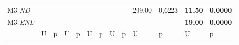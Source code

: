 \begin{table}[H]
\begin{tabular}{l|ll|ll|ll|ll|ll|ll}
M3 \textit{ND}  & \textbf{}      & \textbf{}       & \textbf{}                 & \textbf{}                & \textbf{}                 & \textbf{}                 & \textbf{}                 & \textbf{}                & 209,00                    & 0,6223                    & \textbf{11,50}  & \textbf{0,0000} \\
M3 \textit{END} & \textbf{}      & \textbf{}       & \textbf{}                 & \textbf{}                & \textbf{}                 & \textbf{}                 & \textbf{}                 & \textbf{}                & \textbf{}                 & \textbf{}                 & \textbf{19,00}  & \textbf{0,0000} \\ \hline
                                 & U              & p               & U                         & p                        & U                         & p                         & U                         & p                        & U                         & p                         & U               & p              
\end{tabular}
\end{table}

